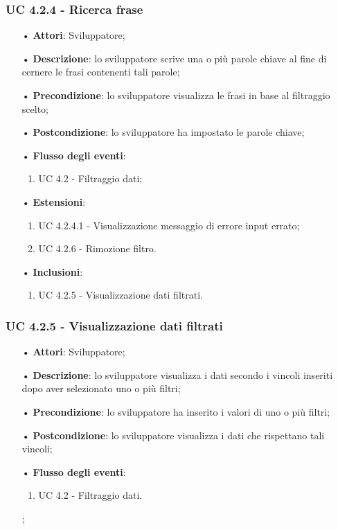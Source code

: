 \subsubsection{UC 4.2.4 - Ricerca frase}
\begin{itemize}
\item[•]\textbf{Attori}: Sviluppatore;
\item[•]\textbf{Descrizione}: lo sviluppatore scrive una o più parole chiave al fine di cernere le frasi contenenti tali parole;
\item[•]\textbf{Precondizione}: lo sviluppatore visualizza le frasi in base al filtraggio scelto;
\item[•]\textbf{Postcondizione}: lo sviluppatore ha impostato le parole chiave;
\item[•]\textbf{Flusso degli eventi}: 
\begin{enumerate}
	\item UC 4.2 - Filtraggio dati;
\end{enumerate}
\item[•]\textbf{Estensioni}: 
\begin{enumerate}
	\item UC 4.2.4.1 - Visualizzazione messaggio di errore input errato;
	\item UC 4.2.6 - Rimozione filtro.
\end{enumerate}
\item[•]\textbf{Inclusioni}:
\begin{enumerate}
\item UC 4.2.5 - Visualizzazione dati filtrati.
\end{enumerate}
\end{itemize}

\subsubsection{UC 4.2.5 - Visualizzazione dati filtrati}
\begin{itemize}
\item[•]\textbf{Attori}: Sviluppatore;
\item[•]\textbf{Descrizione}: lo sviluppatore visualizza i dati secondo i vincoli inseriti dopo aver selezionato uno o più filtri;
\item[•]\textbf{Precondizione}: lo sviluppatore ha inserito i valori di uno o più filtri;
\item[•]\textbf{Postcondizione}: lo sviluppatore visualizza i dati che rispettano tali vincoli;
\item[•]\textbf{Flusso degli eventi}: 
\begin{enumerate}
	\item UC 4.2 - Filtraggio dati.
\end{enumerate};
\end{itemize}

